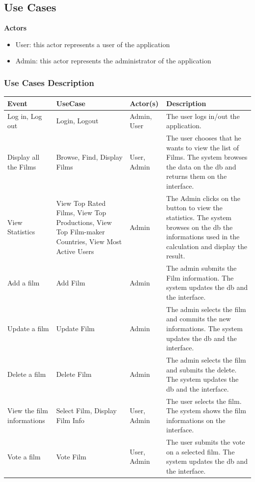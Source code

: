\documentclass[a4paper, oneside]{article}
\begin{document}
\clearpage

\subsection{Use Cases}

\textbf{Actors}
\begin{itemize}
\item{User: this actor represents a user of the application}
\item{Admin: this actor represents the administrator of the application}
\end{itemize}

\subsubsection{Use Cases Description}
\begin{table}[h]
\centering
\begin{tabular}{p{}p{}lp{}}
\hline
\textbf{Event} & \textbf{UseCase} & \textbf{Actor(s)} & \textbf{Description}\\ \hline
Log in, Log out & Login,  Logout & Admin, User & The user logs in/out the application.\\ \hline
Display all the Films & Browse, Find, Display Films & User, Admin & The user chooses that he wants to view the list of Films. The system browses the data on the db and returns them on the interface.\\ \hline
View Statistics & View Top Rated Films, View Top Productions, View Top Film-maker Countries, View Most Active Users & Admin & The Admin clicks on the button to view the statistics. The system browses on the db the informations used in the calculation and display the result.\\ \hline
Add a film & Add Film & Admin & The admin submits the Film information. The system updates the db and the interface.\\ \hline
Update a film & Update Film & Admin & The admin selects the film and commits the new informations. The system updates the db and the interface.\\ \hline
Delete a film & Delete Film & Admin & The admin selects the film and submits the delete. The system updates the db and the interface.\\ \hline
View the film informations & Select Film, Display Film Info & User, Admin & The user selects the film. The system shows the film informations on the interface.\\ \hline
Vote a film & Vote Film & User, Admin & The user submits the vote on a selected film. The system updates the db and the interface.\\ \hline
\end{tabular}
\end{table}
\end{document}
